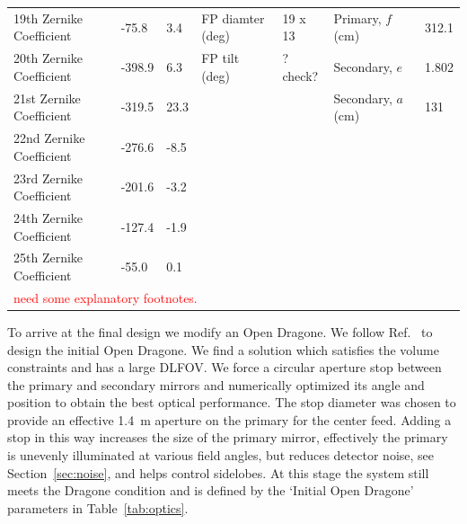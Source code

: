 \documentclass[]{spie}  %
\newcommand{\comr}[1]{\textcolor{red}{#1}}
\begin{document}
\begin{table}[ht]
\begin{adjustbox}{width=1.1\textwidth}
\begin{tabular}{|l|llll||ll|}
19th Zernike Coefficient  & -75.8             & 3.4               & FP diamter (deg)          & 19 x 13  & Primary, $f$ (cm)             & 312.1 \\
20th Zernike Coefficient  & -398.9            & 6.3               & FP tilt (deg)            & ?check?  & Secondary, $e$                & 1.802 \\
21st Zernike Coefficient  & -319.5            & 23.3              &                           &         & Secondary, $a$ (cm)          & 131   \\
22nd Zernike Coefficient  & -276.6            & -8.5              &                           &         &                                &       \\
23rd Zernike Coefficient  & -201.6            & -3.2              &                           &         &                                &       \\
24th Zernike Coefficient  & -127.4            & -1.9              &                           &         &                                &       \\
25th Zernike Coefficient  & -55.0             & 0.1               &                           &         &                                &       \\\hline
\multicolumn{7}{l}{\footnotesize  \comr{need some explanatory footnotes.}} \\
\end{tabular}
\end{adjustbox}
\end{table}

To arrive at the final design we modify an Open Dragone.  We follow Ref.~ to design the initial 
Open Dragone. We find a solution which satisfies the volume constraints and has a large DLFOV.  We force a circular aperture stop 
between the primary and secondary mirrors and numerically optimized its angle and position to obtain the best 
optical performance.  The stop diameter was chosen to provide an effective 1.4~m aperture on the primary for the center feed.  
Adding a stop in this way increases the size of the primary mirror, effectively the primary is unevenly illuminated at various 
field angles, but reduces detector noise, see Section~\ref{sec:noise}, and helps control sidelobes.  At this stage the system still meets 
the Dragone condition and is defined by the `Initial Open Dragone' parameters in Table~\ref{tab:optics}.
\end{document}
